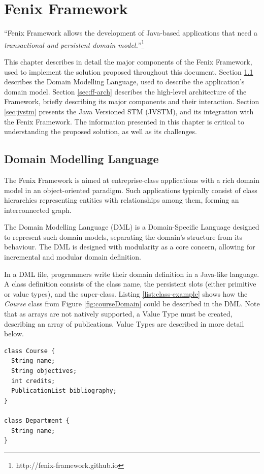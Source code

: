 \chapter{Fenix Framework}
\label{chap:ff}

``Fenix Framework allows the development of Java-based applications
that need a {\it transactional and persistent domain
  model.}''\footnote{http://fenix-framework.github.io}

This chapter describes in detail the major components of the Fenix
Framework, used to implement the solution proposed throughout this
document. Section \ref{sec:dml} describes the Domain Modelling
Language, used to describe the application's domain model. Section
\ref{sec:ff-arch} describes the high-level architecture of the
Framework, briefly describing its major components and their
interaction. Section \ref{sec:jvstm} presents the Java Versioned STM
(JVSTM), and its integration with the Fenix Framework. The information
presented in this chapter is critical to understanding the proposed
solution, as well as its challenges.

\section{Domain Modelling Language}
\label{sec:dml}

The Fenix Framework is aimed at entreprise-class applications with a
rich domain model in an object-oriented paradigm. Such applications
typically consist of class hierarchies representing entities with
relationships among them, forming an interconnected graph. 

The Domain Modelling Language (DML) is a Domain-Specific Language
designed to represent such domain models, separating the domain's
structure from its behaviour. The DML is designed with modularity as a
core concern, allowing for incremental and modular domain definition.

In a DML file, programmers write their domain definition in a
Java-like language. A class definition consists of the class name, the
persistent slots (either primitive or value types), and the
super-class. Listing \ref{list:class-example} shows how the {\it
  Course} class from Figure \ref{fig:courseDomain} could be described
in the DML. Note that as arrays are not natively supported, a Value
Type must be created, describing an array of publications. Value Types
are described in more detail below.

\begin{lstlisting}[caption={DML for the {\it Course} and {\it
      Department} classes},
  label={list:class-example}]
class Course {
  String name;
  String objectives;
  int credits;
  PublicationList bibliography;
}

class Department {
  String name;
}
\end{lstlisting}

